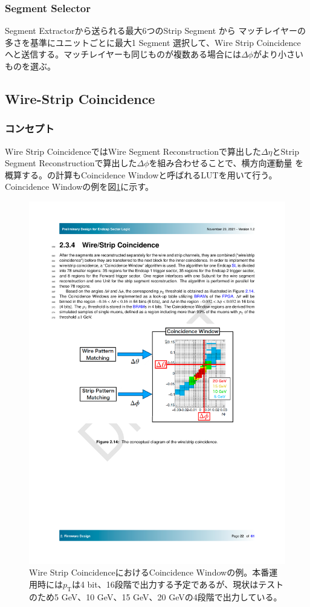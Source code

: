 \subsubsection*{Segment Selector}
Segment Extractorから送られる最大6つのStrip Segment から マッチレイヤーの多さを基準にユニットごとに最大1 Segment 選択して、Wire Strip Coincidence へと送信する。マッチレイヤーも同じものが複数ある場合には$\Delta\phi$がより小さいものを選ぶ。

\subsection{Wire-Strip Coincidence}
\subsubsection*{コンセプト}
Wire Strip CoincidenceではWire Segment Reconstructionで算出した$\Delta\eta$とStrip Segment Reconstructionで算出した$\Delta\phi$を組み合わせることで、横方向運動量 \pt を概算する。\pt の計算もCoincidence Windowと呼ばれるLUTを用いて行う。Coincidence Windowの例を図\ref{Concept_WS}に示す。

\begin{figure} 
\centering
\includegraphics[width=16cm]{fig/SL/Concept_WS.pdf}
\caption[Wire Strip CoincidenceにおけるCoincidence Windowの例]{Wire Strip CoincidenceにおけるCoincidence Windowの例\cite{SLPDR}。本番運用時には$p_\mathrm{T}$は4 bit、16段階で出力する予定であるが、現状はテストのため5 GeV、10 GeV、15 GeV、20 GeVの4段階で出力している。}
\label{Concept_WS}
\end{figure}

